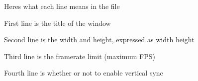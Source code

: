 \label{md_src_2config_2window_8ini_autotoc_md0}%
%
 Here\textquotesingle{}s what each line means in the {\ttfamily {}} file


\begin{DoxyEnumerate}
\item First line is the title of the window
\item Second line is the width and height, expressed as {\ttfamily width height}
\item Third line is the framerate limit (maximum FPS)
\item Fourth line is whether or not to enable vertical sync 
\end{DoxyEnumerate}